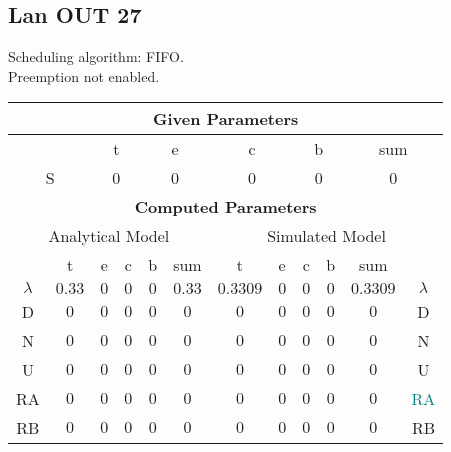 \documentclass{article}
\begin{document}
\subsection{Lan OUT 27}
Scheduling algorithm: FIFO.\\Preemption not enabled. \\\begin{table}[H]\centering\begin{tabular}{@{}c|cccc|c||cccc|c|c@{}}\toprule\multicolumn{12}{c}{\textbf{Given Parameters}}\\\midrule\multicolumn{2}{c|}{ } & \multicolumn{2}{c}{t} & \multicolumn{2}{c}{e} & \multicolumn{2}{c}{c} & \multicolumn{2}{c}{b} & \multicolumn{2}{|c}{sum} \\ \midrule\multicolumn{2}{c|}{S} & \multicolumn{2}{c}{0} & \multicolumn{2}{c}{0} & \multicolumn{2}{c}{0} & \multicolumn{2}{c}{0} & \multicolumn{2}{|c}{0}\\ \midrule\midrule\multicolumn{12}{c}{\textbf{Computed Parameters}}\\ \midrule\multicolumn{6}{c||}{Analytical Model} & \multicolumn{6}{c}{Simulated Model}\\ 
 \midrule & t & e & c & b & sum & t & e & c & b & sum &  \\ \midrule$\lambda$ &$0.33$ & $0$ & $0$ & $0$ & $0.33$ & $0.3309$ & $0$ & $0$ & $0$ & $0.3309$& $\lambda$ \\D & $0$ & $0$ & $0$ & $0$ & $0$ & $0$ & $0$ & $0$ & $0$ & $0$& D\\N & $0$ & $0$ & $0$ & $0$ & $0$ & $0$ & $0$ & $0$ & $0$ & $0$& N\\U & $0$ & $0$ & $0$ & $0$ & $0$ & $0$ & $0$ & $0$ & $0$ & $0$& U\\RA & $0$ & $0$ & $0$ & $0$ & $0$ & $0$ & $0$ & $0$ & $0$ & $0$& \textcolor{teal}{RA}\\RB & $0$ & $0$ & $0$ & $0$ & $0$ & $0$ & $0$ & $0$ & $0$ & $0$& RB\\
\bottomrule
\end{tabular}
\end{table}
\filbreak
\end{document}
